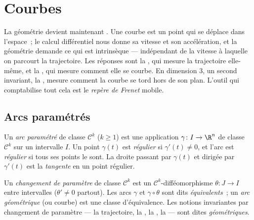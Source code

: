 \chapter{Courbes}\label{ch:b2:curves}

La géométrie devient maintenant . Une courbe est un
point qui se déplace dans l'espace~; le calcul différentiel nous
donne sa vitesse et son accélération, et la géométrie demande ce
qui est intrinsèque --- indépendant de la vitesse à laquelle on
parcourt la trajectoire. Les réponses sont la \emph{}, qui mesure la trajectoire elle-même, et la
\emph{}, qui mesure comment elle se courbe. En dimension
$3$, un second invariant, la \emph{}, mesure comment la
courbe se tord hors de son plan. L'outil qui comptabilise tout
cela est le \emph{repère de Frenet} mobile.

\section{Arcs paramétrés}

\begin{definition}\label{def:b2:curves:arc}
Un \emph{arc paramétré} de classe
$\mathcal{C}^k$ ($k \geq 1$) est
une application $\gamma \colon I \to \R^n$ de classe
$\mathcal{C}^k$ sur un
intervalle $I$. Un point $\gamma(t)$ est \emph{régulier} si
$\gamma'(t) \neq 0$, et l'arc est \emph{régulier} si tous ses
points le sont. La droite passant par $\gamma(t)$ et dirigée par
$\gamma'(t)$ est la \emph{tangente} en un point
régulier.
\end{definition}

\begin{definition}\label{def:b2:curves:reparam}
Un \emph{changement de paramètre}
de classe $\mathcal{C}^k$ est un
$\mathcal{C}^k$-difféomorphisme $\theta \colon J \to I$ entre
intervalles ($\theta' \neq 0$ partout). Les arcs $\gamma$ et
$\gamma \circ \theta$ sont dits \emph{équivalents}~; un
\emph{arc géométrique} (ou courbe) est une
classe d'équivalence. Les notions
invariantes par changement de paramètre --- la trajectoire, la
, la , la  --- sont dites
\emph{géométriques}.
\end{definition}


